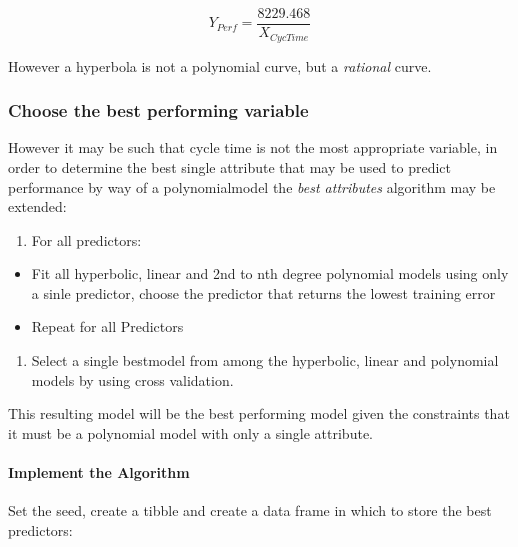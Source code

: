 \documentclass[12pt]{article}
\providecommand{\tightlist}{%
  \setlength{\itemsep}{0pt}\setlength{\parskip}{0pt}}
\let\oldparagraph\paragraph
\renewcommand{\paragraph}[1]{\oldparagraph{#1}\mbox{}}
\begin{document}
\[
Y_{Perf} = \frac{8229.468}{X_{CycTime}}
\]

However a hyperbola is not a polynomial curve, but a \emph{rational}
curve.

\hypertarget{choose-the-best-performing-variable}{%
\subsubsection{Choose the best performing
variable}\label{choose-the-best-performing-variable}}

However it may be such that cycle time is not the most appropriate
variable, in order to determine the best single attribute that may be
used to predict performance by way of a polynomialmodel the \emph{best
attributes} algorithm may be extended:

\begin{enumerate}
\def\labelenumi{\arabic{enumi}.}
\tightlist
\item
  For all predictors:
\end{enumerate}

\begin{itemize}
\tightlist
\item
  Fit all hyperbolic, linear and 2nd to nth degree polynomial models
  using only a sinle predictor, choose the predictor that returns the
  lowest training error
\item
  Repeat for all Predictors
\end{itemize}

\begin{enumerate}
\def\labelenumi{\arabic{enumi}.}
\setcounter{enumi}{1}
\tightlist
\item
  Select a single bestmodel from among the hyperbolic, linear and
  polynomial models by using cross validation.
\end{enumerate}

This resulting model will be the best performing model given the
constraints that it must be a polynomial model with only a single
attribute.

\hypertarget{implement-the-algorithm}{%
\paragraph{Implement the Algorithm}\label{implement-the-algorithm}}

Set the seed, create a tibble and create a data frame in which to store
the best predictors:
\end{document}
